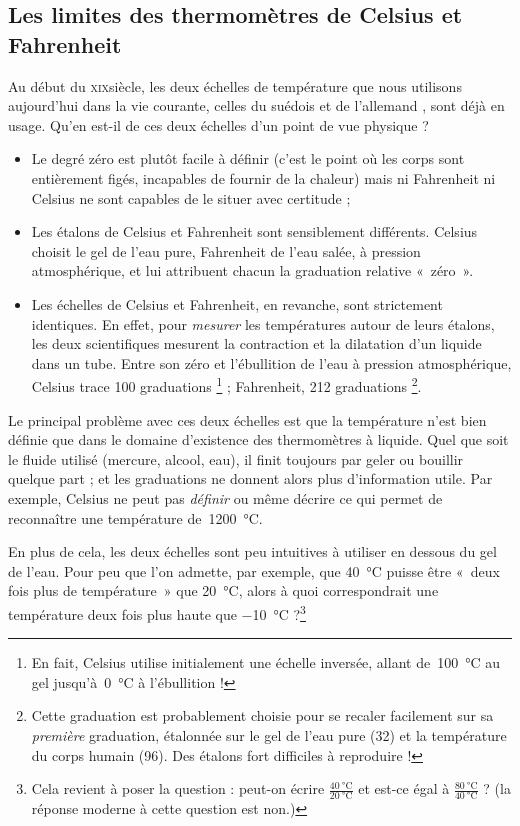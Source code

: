 	\subsection{Les limites des thermomètres de Celsius et Fahrenheit}
	
		Au début du \textsc{xix}\ieme siècle, les deux échelles de température que nous utilisons aujourd’hui dans la vie courante, celles du suédois  et de l’allemand , sont déjà en usage. Qu’en est-il de ces deux échelles d’un point de vue physique ?
			
		\begin{itemize}
			\item Le degré zéro est plutôt facile à définir (c’est le point où les corps sont entièrement figés, incapables de fournir de la chaleur) mais ni Fahrenheit ni Celsius ne sont capables de le situer avec certitude ;
			\item Les étalons de Celsius et Fahrenheit sont sensiblement différents. Celsius choisit le gel de l’eau pure, Fahrenheit de l’eau salée, à pression atmosphérique, et lui attribuent chacun la graduation relative «~zéro~».
			\item Les échelles de Celsius et Fahrenheit, en revanche, sont strictement identiques. En effet, pour \emph{mesurer} les températures autour de leurs étalons, les deux scientifiques mesurent la contraction et la dilatation d’un liquide dans un tube. Entre son zéro et l’ébullition de l’eau à pression atmosphérique, Celsius trace 100 graduations%
			\footnote{En fait, Celsius utilise initialement une échelle inversée, allant de~\SI{100}{\celsius} au gel jusqu’à~\SI{0}{\celsius} à l’ébullition !} ; Fahrenheit, 212 graduations%
			\footnote{Cette graduation est probablement choisie pour se recaler facilement sur sa \emph{première} graduation, étalonnée sur le gel de l’eau pure (32) et la température du corps humain (96). Des étalons fort difficiles à reproduire !}.
		\end{itemize}
		
		Le principal problème avec ces deux échelles est que la température n’est bien définie que dans le domaine d’existence des thermomètres à liquide. Quel que soit le fluide utilisé (mercure, alcool, eau), il finit toujours par geler ou bouillir quelque part ; et les graduations ne donnent alors plus d’information utile. Par exemple, Celsius ne peut pas \emph{définir} ou même décrire ce qui permet de reconnaître une température de~\SI{1200}{\celsius}.
		
		En plus de cela, les deux échelles sont peu intuitives à utiliser en dessous du gel de l’eau. Pour peu que l’on admette, par exemple, que \SI{40}{\celsius} puisse être «~deux fois plus de température~» que \SI{20}{\celsius}, alors à quoi correspondrait une température deux fois plus haute que \SI{-10}{\celsius} ?\footnote{Cela revient à poser la question : peut-on écrire $\frac{\SI{40}{\celsius}}{\SI{20}{\celsius}}$ et est-ce égal à $\frac{\SI{80}{\celsius}}{\SI{40}{\celsius}}$ ? (la réponse moderne à cette question est non.)}
		
